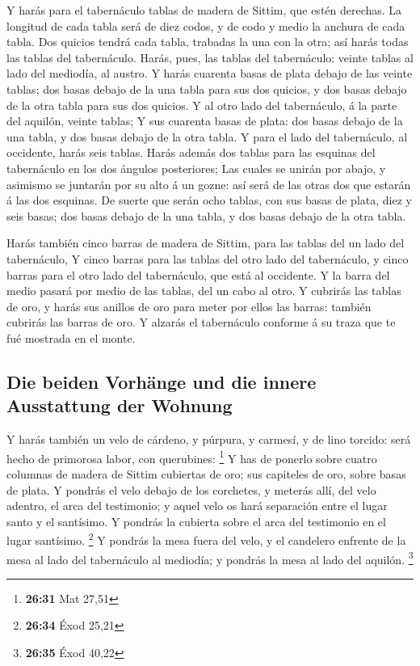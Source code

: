  Y harás para el tabernáculo tablas de madera de Sittim,
que estén derechas.  La longitud de cada tabla será de diez
codos, y de codo y medio la anchura de cada tabla.  Dos
quicios tendrá cada tabla, trabadas la una con la otra; así harás todas
las tablas del tabernáculo.  Harás, pues, las tablas del
tabernáculo: veinte tablas al lado del mediodía, al austro.
 Y harás cuarenta basas de plata debajo de las veinte
tablas; dos basas debajo de la una tabla para sus dos quicios, y dos
basas debajo de la otra tabla para sus dos quicios.  Y al
otro lado del tabernáculo, á la parte del aquilón, veinte tablas;
 Y sus cuarenta basas de plata: dos basas debajo de la una
tabla, y dos basas debajo de la otra tabla.  Y para el lado
del tabernáculo, al occidente, harás seis tablas.  Harás
además dos tablas para las esquinas del tabernáculo en los dos ángulos
posteriores;  Las cuales se unirán por abajo, y asimismo se
juntarán por su alto á un gozne: así será de las otras dos que estarán á
las dos esquinas.  De suerte que serán ocho tablas, con sus
basas de plata, diez y seis basas; dos basas debajo de la una tabla, y
dos basas debajo de la otra tabla.

 Harás también cinco barras de madera de Sittim, para las
tablas del un lado del tabernáculo,  Y cinco barras para
las tablas del otro lado del tabernáculo, y cinco barras para el otro
lado del tabernáculo, que está al occidente.  Y la barra
del medio pasará por medio de las tablas, del un cabo al otro.
 Y cubrirás las tablas de oro, y harás sus anillos de oro
para meter por ellos las barras: también cubrirás las barras de oro.
 Y alzarás el tabernáculo conforme á su traza que te fué
mostrada en el monte.

\hypertarget{die-beiden-vorhuxe4nge-und-die-innere-ausstattung-der-wohnung}{%
\subsection{Die beiden Vorhänge und die innere Ausstattung der
Wohnung}\label{die-beiden-vorhuxe4nge-und-die-innere-ausstattung-der-wohnung}}

 Y harás también un velo de cárdeno, y púrpura, y carmesí,
y de lino torcido: será hecho de primorosa labor, con querubines:
\footnote{\textbf{26:31} Mat 27,51}  Y has de ponerlo sobre
cuatro columnas de madera de Sittim cubiertas de oro; sus capiteles de
oro, sobre basas de plata.  Y pondrás el velo debajo de los
corchetes, y meterás allí, del velo adentro, el arca del testimonio; y
aquel velo os hará separación entre el lugar santo y el santísimo.
 Y pondrás la cubierta sobre el arca del testimonio en el
lugar santísimo. \footnote{\textbf{26:34} Éxod 25,21}  Y
pondrás la mesa fuera del velo, y el candelero enfrente de la mesa al
lado del tabernáculo al mediodía; y pondrás la mesa al lado del aquilón.
\footnote{\textbf{26:35} Éxod 40,22}

